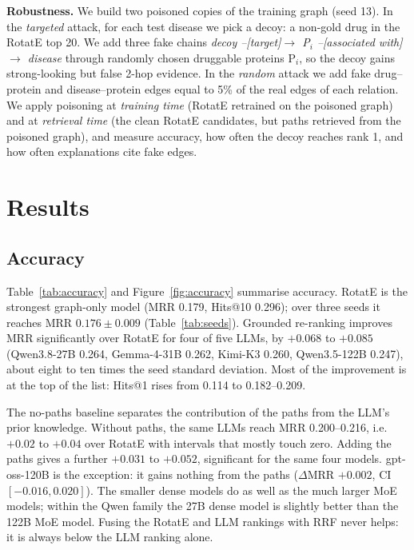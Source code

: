 \documentclass[electronics,article,submit]{Definitions/mdpi}
\newcommand{\dmrr}{$\Delta$MRR}
\begin{document}
\textbf{Robustness.} We build two poisoned copies of the training graph (seed 13). In the \emph{targeted} attack, for each test disease we pick a decoy: a non-gold drug in the RotatE top 20. We add three fake chains \textit{decoy --[target]$\to$ P$_i$ --[associated with]$\to$ disease} through randomly chosen druggable proteins P$_i$, so the decoy gains strong-looking but false 2-hop evidence. In the \emph{random} attack we add fake drug--protein and disease--protein edges equal to 5\% of the real edges of each relation. We apply poisoning at \emph{training time} (RotatE retrained on the poisoned graph) and at \emph{retrieval time} (the clean RotatE candidates, but paths retrieved from the poisoned graph), and measure accuracy, how often the decoy reaches rank 1, and how often explanations cite fake edges.

\section{Results}
\subsection{Accuracy}\label{sec:accuracy}
Table~\ref{tab:accuracy} and Figure~\ref{fig:accuracy} summarise accuracy. RotatE is the strongest graph-only model (MRR 0.179, Hits@10 0.296); over three seeds it reaches MRR $0.176\pm0.009$ (Table~\ref{tab:seeds}). Grounded re-ranking improves MRR significantly over RotatE for four of five LLMs, by $+0.068$ to $+0.085$ (Qwen3.8-27B 0.264, Gemma-4-31B 0.262, Kimi-K3 0.260, Qwen3.5-122B 0.247), about eight to ten times the seed standard deviation. Most of the improvement is at the top of the list: Hits@1 rises from 0.114 to 0.182--0.209.

The no-paths baseline separates the contribution of the paths from the LLM's prior knowledge. Without paths, the same LLMs reach MRR 0.200--0.216, i.e.\ $+0.02$ to $+0.04$ over RotatE with intervals that mostly touch zero. Adding the paths gives a further $+0.031$ to $+0.052$, significant for the same four models. gpt-oss-120B is the exception: it gains nothing from the paths (\dmrr{} $+0.002$, CI $[-0.016, 0.020]$). The smaller dense models do as well as the much larger MoE models; within the Qwen family the 27B dense model is slightly better than the 122B MoE model. Fusing the RotatE and LLM rankings with RRF never helps: it is always below the LLM ranking alone.
\end{document}

